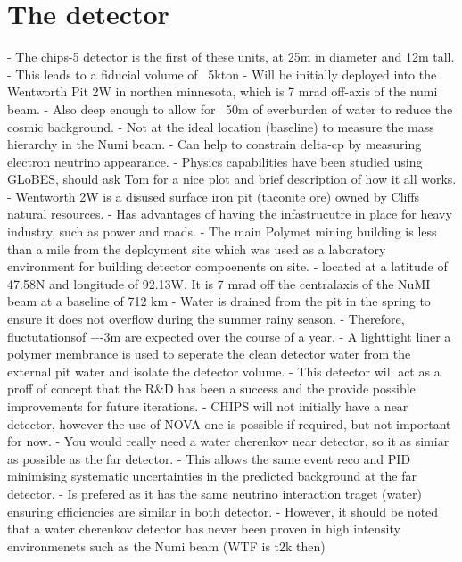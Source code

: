 \section{The \chipsfive detector} %
\label{sec:chips_detector} %

- The chips-5 detector is the first of these units, at 25m in diameter and 12m tall.
- This leads to a fiducial volume of ~5kton
- Will be initially deployed into the Wentworth Pit 2W in northen minnesota, which is 7 mrad
off-axis of the numi beam.
- Also deep enough to allow for ~50m of everburden of water to reduce the cosmic background.
- Not at the ideal location (baseline) to measure the mass hierarchy in the Numi beam.
- Can help to constrain delta-cp by measuring electron neutrino appearance.
- Physics capabilities have been studied using GLoBES, should ask Tom for a nice plot and brief
description of how it all works.
- Wentworth 2W is a disused surface iron pit (taconite ore) owned by Cliffs natural resources.
- Has advantages of having the infastrucutre in place for heavy industry, such as power and roads.
- The main Polymet mining building is less than a mile from the deployment site which was used as
a laboratory environment for building detector compoenents on site.
- located at a latitude of 47.58N and longitude of 92.13W. It is 7 mrad off the centralaxis of the
NuMI beam at a baseline of 712 km
- Water is drained from the pit in the spring to ensure it does not overflow during the summer
rainy season.
- Therefore, fluctutationsof +-3m are expected over the course of a year.
- A lighttight liner a polymer membrance is used to seperate the clean detector water from the
external pit water and isolate the detector volume.
- This detector will act as a proff of concept that the R\&D has been a success and the provide
possible improvements for future iterations.
- CHIPS will not initially have a near detector, however the use of NOVA one is possible if
required, but not important for now.
- You would really need a water cherenkov near detector, so it as simiar as possible as the far
detector.
- This allows the same event reco and PID minimising systematic uncertainties in the predicted
background at the far detector.
- Is prefered as it has the same neutrino interaction traget (water) ensuring efficiencies are
similar in both detector.
- However, it should be noted that a water cherenkov detector has never been proven in high
intensity environmenets such as the Numi beam (WTF is t2k then)

